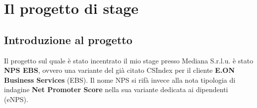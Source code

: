 
\chapter{Il progetto di stage}
\label{cap:progetto-stage}


\section{Introduzione al progetto}
Il progetto sul quale è stato incentrato il mio stage presso Mediana S.r.l.u. è stato \textbf{NPS EBS}, ovvero una variante del già citato CSIndex per il cliente \textbf{E.ON Business Services} (EBS). Il nome NPS si rifà invece alla nota tipologia di indagine \textbf{Net Promoter Score} nella sua variante dedicata ai dipendenti (eNPS).

